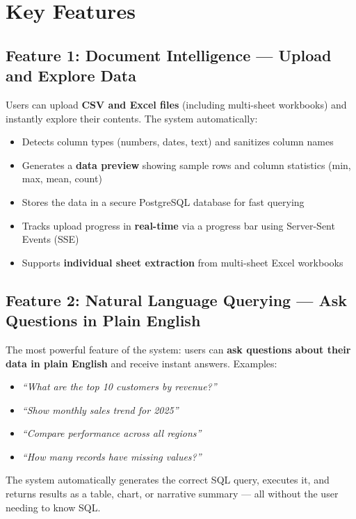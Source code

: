 \documentclass[12pt,a4paper]{report}
\begin{document}
\section{Key Features}

\subsection{Feature 1: Document Intelligence --- Upload and Explore Data}

Users can upload \textbf{CSV and Excel files} (including multi-sheet workbooks) and instantly explore their contents. The system automatically:

\begin{itemize}[leftmargin=1.5cm]
    \item Detects column types (numbers, dates, text) and sanitizes column names
    \item Generates a \textbf{data preview} showing sample rows and column statistics (min, max, mean, count)
    \item Stores the data in a secure PostgreSQL database for fast querying
    \item Tracks upload progress in \textbf{real-time} via a progress bar using Server-Sent Events (SSE)
    \item Supports \textbf{individual sheet extraction} from multi-sheet Excel workbooks
\end{itemize}

\subsection{Feature 2: Natural Language Querying --- Ask Questions in Plain English}

The most powerful feature of the system: users can \textbf{ask questions about their data in plain English} and receive instant answers. Examples:

\begin{itemize}[leftmargin=1.5cm]
    \item \textit{``What are the top 10 customers by revenue?''}
    \item \textit{``Show monthly sales trend for 2025''}
    \item \textit{``Compare performance across all regions''}
    \item \textit{``How many records have missing values?''}
\end{itemize}

The system automatically generates the correct SQL query, executes it, and returns results as a table, chart, or narrative summary --- all without the user needing to know SQL.
\end{document}
